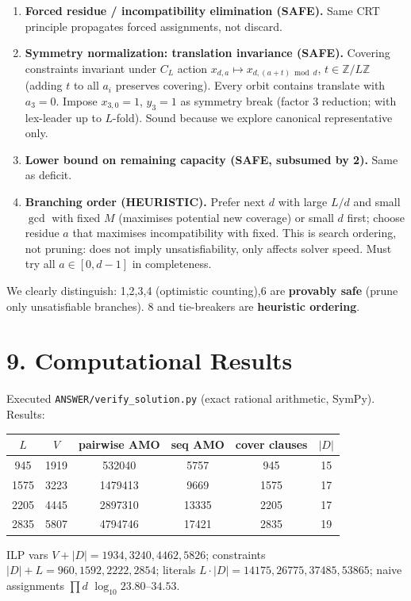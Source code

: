 \documentclass[11pt,a4paper]{article}
\theoremstyle{plain}
\theoremstyle{definition}
\theoremstyle{remark}
\newcommand{\Z}{\mathbb{Z}}
\begin{document}
\begin{enumerate}[label=\textbf{\arabic*.}]
\item \textbf{Forced residue / incompatibility elimination (SAFE).} Same CRT principle propagates forced assignments, not discard.

\item \textbf{Symmetry normalization: translation invariance (SAFE).} Covering constraints invariant under $C_{L}$ action $x_{d,a}\mapsto x_{d,(a+t)\bmod d}$, $t\in\Z/L\Z$ (adding $t$ to all $a_{i}$ preserves covering). Every orbit contains translate with $a_{3}=0$. Impose $x_{3,0}=1$, $y_{3}=1$ as symmetry break (factor $3$ reduction; with lex-leader up to $L$-fold). Sound because we explore canonical representative only.

\item \textbf{Lower bound on remaining capacity (SAFE, subsumed by 2).} Same as deficit.

\item \textbf{Branching order (HEURISTIC).} Prefer next $d$ with large $L/d$ and small $\gcd$ with fixed $M$ (maximises potential new coverage) or small $d$ first; choose residue $a$ that maximises incompatibility with fixed. This is search ordering, not pruning: does not imply unsatisfiability, only affects solver speed. Must try all $a\in[0,d-1]$ in completeness.

\end{enumerate}

We clearly distinguish: 1,2,3,4 (optimistic counting),6 are \textbf{provably safe} (prune only unsatisfiable branches). 8 and tie-breakers are \textbf{heuristic ordering}.

\section{9. Computational Results}

Executed \texttt{ANSWER/verify\_solution.py} (exact rational arithmetic, SymPy). Results:

\begin{center}
\begin{tabular}{c|c|c|c|c|c}
$L$ & $V$ & pairwise AMO & seq AMO & cover clauses & $|D|$ \\ \midrule
945 & 1919 & 532040 & 5757 & 945 & 15\\
1575 & 3223 & 1479413 & 9669 & 1575 & 17\\
2205 & 4445 & 2897310 & 13335 & 2205 & 17\\
2835 & 5807 & 4794746 & 17421 & 2835 & 19
\end{tabular}
\end{center}
ILP vars $V+|D|=1934,3240,4462,5826$; constraints $|D|+L=960,1592,2222,2854$; literals $L\cdot|D|=14175,26775,37485,53865$; naive assignments $\prod d$ $\log_{10}23.80$--$34.53$.
\end{document}
